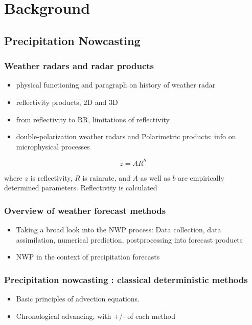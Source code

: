 \chapter{Background}
\label{chapter:background} 

\section{Precipitation Nowcasting}

\subsection{Weather radars and radar products}


\begin{itemize}
	\item physical functioning and paragraph on history of weather radar
	\item reflectivity products, 2D and 3D
	
	\item from reflectivity to RR, limitations of reflectivity
	\item double-polarization weather radars and Polarimetric products: info on microphysical processes
\end{itemize}

\begin{equation}
\label{eq:z-r}
	z = AR^b
\end{equation}

where $z$ is reflectivity, $R$ is rainrate, and $A$ as well as $b$ are empirically determined parameters. Reflectivity is calculated 

\subsection{Overview of weather forecast methods}
\begin{itemize}
	\item Taking a broad look into the NWP process: Data collection, data assimilation, numerical prediction, postprocessing into forecast products
	\item NWP in the context of precipitation forecasts
\end{itemize}


\subsection{Precipitation nowcasting : classical deterministic methods}
\label{section:classic_nowcast}
\begin{itemize}
	\item Basic principles of advection equations. 
	\item Chronological advancing, with +/- of each method
\end{itemize}

